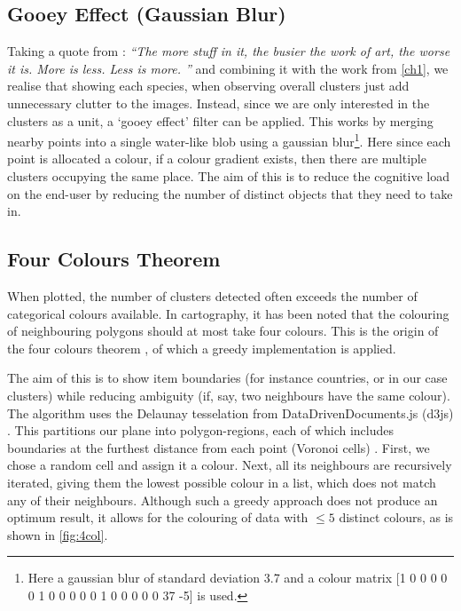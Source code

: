 \subsection{Gooey Effect (Gaussian Blur)}
Taking a quote from \cite{lessmore}:
\emph{``The more stuff in it, the busier the work of art, the worse it is. More is less. Less is more. %
''} and combining it with the work from \autoref{ch1}, we realise that showing each species, when observing overall clusters just add unnecessary clutter to the images. Instead, since we are only interested in the clusters as a unit, a `gooey effect' filter can be applied. This works by merging nearby points into a single water-like blob using a gaussian blur\footnote{Here a gaussian blur of standard deviation 3.7 and a colour matrix [1 0 0 0 0  0 1 0 0 0  0 0 1 0 0  0 0 0 37 -5] is used.}. Here since each point is allocated a colour, if a colour gradient exists, then there are multiple clusters occupying the same place. The aim of this is to reduce the cognitive load on the end-user by reducing the number of distinct objects that they need to take in.



\subsection{Four Colours Theorem}\label{sec:4col}
When plotted, the number of clusters detected often exceeds the number of categorical colours available. In cartography, it has been noted that the colouring of neighbouring polygons should at most take four colours. This is the origin of the four colours theorem \citep{fourcolour}, of which a greedy implementation is applied.

The aim of this is to show item boundaries (for instance countries, or in our case clusters) while reducing ambiguity (if, say, two neighbours have the same colour). The algorithm uses the Delaunay tesselation from DataDrivenDocuments.js (d3js) \citep{d3js}. This partitions our plane into polygon-regions, each of which includes boundaries at the furthest distance from each point (Voronoi cells) \citep{delaunay}. First, we chose a random cell and assign it a colour.
Next, all its neighbours are recursively iterated, giving them the lowest possible colour in a list, which does not match any of their neighbours. Although such a greedy approach does not produce an optimum result, it allows for the colouring of data with $\le 5$ distinct colours, as is shown in \autoref{fig:4col}.


